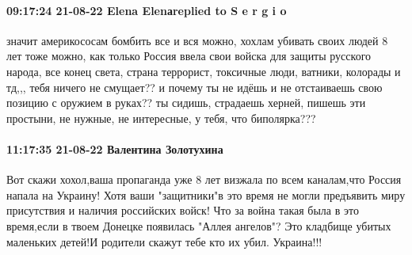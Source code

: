 \paragraph{09:17:24 21-08-22 Elena Elenаreplied to S e r g i o}

значит америкососам бомбить все и вся можно, хохлам убивать своих людей 8 лет
тоже можно, как только Россия ввела свои войска для защиты русского народа, все
конец света, страна террорист, токсичные люди, ватники, колорады и тд,,, тебя
ничего не смущает?? и почему ты не идёшь и не отстаиваешь свою позицию с
оружием в руках?? ты сидишь, страдаешь херней, пишешь эти простыни, не нужные,
не интересные, у тебя, что биполярка???

\paragraph{11:17:35 21-08-22 Валентина Золотухина}

Вот скажи хохол,ваша пропаганда уже 8 лет визжала по всем каналам,что Россия
напала на Украину! Хотя ваши "защитники"в это время не могли предъявить миру
присутствия и наличия российских войск! Что за война такая была в это
время,если в твоем Донецке появилась "Аллея ангелов"? Это кладбище убитых
маленьких детей!И родители скажут тебе кто их убил. Украина!!!
